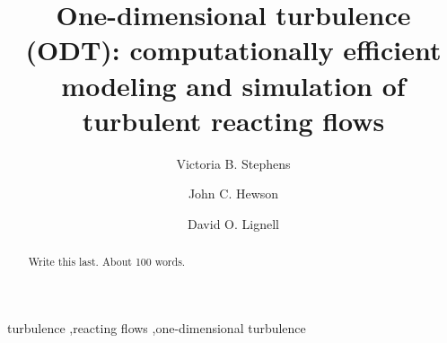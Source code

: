 \documentclass[preprint,12pt, a4paper]{elsarticle}
\begin{document}
\begin{frontmatter}



\title{One-dimensional turbulence (ODT): computationally efficient modeling and simulation of turbulent reacting flows}


\author[label1]{Victoria B. Stephens}
\author[label2]{John C. Hewson}
\author[label1]{David O. Lignell}


\address[label1]{Department of Chemical Engineering, Brigham Young University, Provo, UT 84602, USA}
\address[label2]{Fire Science and Technology Department, Sandia National Laboratories, Albuquerque, NM, USA}

\begin{abstract}
Write this last. About 100 words. 
\end{abstract}

\begin{keyword}
turbulence \sep reacting flows \sep one-dimensional turbulence



\end{keyword}

\end{frontmatter}
\end{document}
